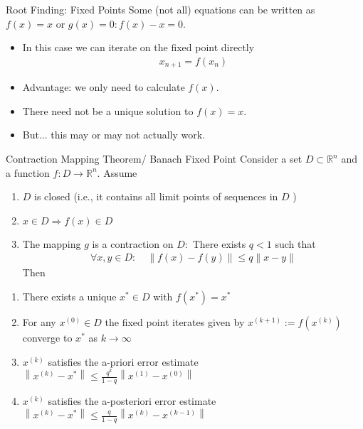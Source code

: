 \documentclass[xcolor=pdftex,dvipsnames,table,mathserif,aspectratio=169]{beamer}
\begin{document}
\begin{frame}{Root Finding: Fixed Points}
Some (not all) equations can be written as $f(x) = x$ or $g(x)=0: f(x)-x =0$.
\begin{itemize}
\item In this case we can iterate on the \alert{fixed point} directly
\begin{align*}
x_{n+1} = f(x_n)
\end{align*}
\item Advantage: we only need to calculate $f(x)$.
\item There need not be a unique solution to $f(x) = x$.
\item But... this may or may not actually work.
\end{itemize}
\end{frame}

\begin{frame}{Contraction Mapping Theorem/ Banach Fixed Point}
\small
Consider a set $D \subset \mathbb{R}^{n}$ and a function $f: D \rightarrow \mathbb{R}^{n} .$ Assume
\begin{enumerate}
\item $D$ is closed (i.e., it contains all limit points of sequences in $D$ )
\item $x \in D \Longrightarrow f(x) \in D$
\item The mapping $g$ is a contraction on $D:$ There exists $q<1$ such that
\begin{align*}
\forall x, y \in D: \quad\|f(x)-f(y)\| \leq q\|x-y\|
\end{align*}
\noindent Then \vspace{-.3cm}
\end{enumerate}
\begin{enumerate}
\item There exists a unique  $x^{*} \in D$ with $f\left(x^{*}\right)=x^{*}$
\item For any $x^{(0)} \in D$ the fixed point iterates given by $x^{(k+1)}:=f\left(x^{(k)}\right)$ converge to $x^{*}$ as $k \rightarrow \infty$
\item $x^{(k)}$ satisfies the \alert{a-priori error} estimate $\left\|x^{(k)}-x^{*}\right\| \leq \frac{q^{k}}{1-q}\left\|x^{(1)}-x^{(0)}\right\|$
\item $x^{(k)}$ satisfies the \alert{a-posteriori error} estimate $\left\|x^{(k)}-x^{*}\right\| \leq \frac{q}{1-q}\left\|x^{(k)}-x^{(k-1)}\right\|$
\end{enumerate}
\end{frame}
\end{document}
